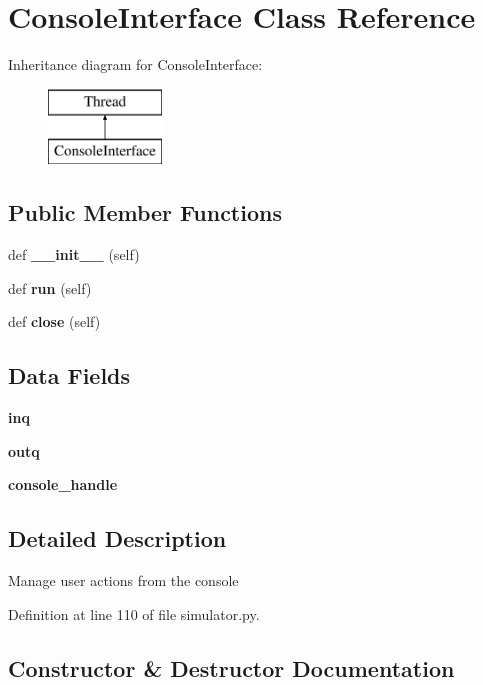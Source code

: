 \section{Console\+Interface Class Reference}
\label{classmodbus__tk_1_1simulator_1_1_console_interface}
Inheritance diagram for Console\+Interface\+:\begin{figure}[H]
\begin{center}
\leavevmode
\includegraphics[height=2.000000cm]{classmodbus__tk_1_1simulator_1_1_console_interface}
\end{center}
\end{figure}
\subsection*{Public Member Functions}
\begin{DoxyCompactItemize}
\item 
def {\bf \+\_\+\+\_\+init\+\_\+\+\_\+} (self)
\item 
def {\bf run} (self)
\item 
def {\bf close} (self)
\end{DoxyCompactItemize}
\subsection*{Data Fields}
\begin{DoxyCompactItemize}
\item 
{\bf inq}
\item 
{\bf outq}
\item 
{\bf console\+\_\+handle}
\end{DoxyCompactItemize}


\subsection{Detailed Description}
\begin{DoxyVerb}Manage user actions from the console\end{DoxyVerb}
 

Definition at line 110 of file simulator.\+py.



\subsection{Constructor \& Destructor Documentation}
